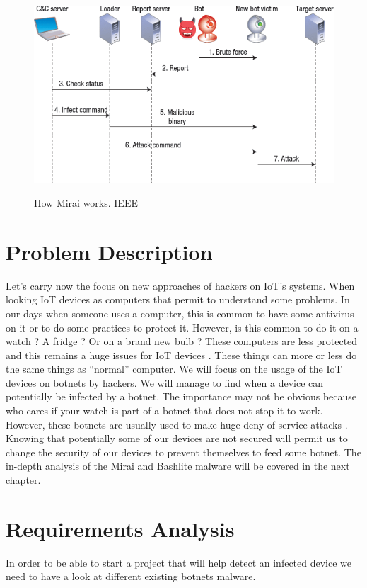 \documentclass{report}
\begin{document}
\newpage
\begin{figure}[h]
 \caption{How Mirai works. IEEE \protect\footnotemark}
 \centering
 \includegraphics[width=1.2\textwidth]{./img/botnet-fonct}
 \label{fig:botnet-fonct}
\end{figure}


\chapter{Problem Description}
Let's carry now the focus on new approaches of hackers on IoT's systems. When looking IoT devices as computers that permit to understand some problems. In our days when someone uses a computer, this is common to have some antivirus on it or to do some practices to protect it. However, is this common to do it on a watch ? A fridge ? Or on a brand new bulb ? These computers are less protected and this remains a huge issues for IoT devices \autocite{yang2017survey}. These things can more or less do the same things as ``normal'' computer. We will focus on the usage of the IoT devices on botnets by hackers. We will manage to find when a device can potentially be infected by a botnet. The importance may not be obvious because who cares if your watch is part of a botnet that does not stop it to work. However, these botnets are usually used to make huge deny of service attacks \autocite{hallman2017ioddos}. Knowing that potentially some of our devices are not secured will permit us to change the security of our devices to prevent themselves to feed some botnet.\newline
The in-depth analysis of the Mirai and Bashlite malware will be covered in the next chapter.

\chapter{Requirements Analysis}
In order to be able to start a project that will help detect an infected device we need to have a look at different existing botnets malware.
\end{document}
